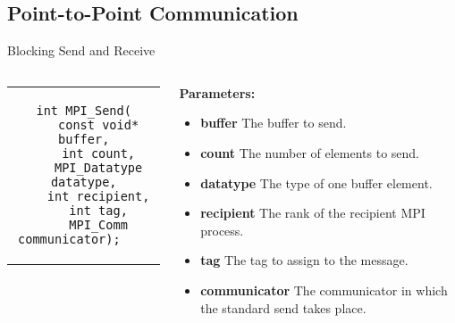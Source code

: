 \subsection{Point-to-Point Communication}

\begin{frame}[fragile]{Blocking Send and Receive}
\begin{columns}
    
\begin{column}{.42\textwidth}
\begin{tabular}{c}
      \begin{verbatim}
int MPI_Send(
    const void* buffer,
    int count,
    MPI_Datatype datatype,
    int recipient,
    int tag,
    MPI_Comm communicator);    
      \end{verbatim}
\end{tabular}
\end{column}

\begin{column}{.58\textwidth}
\textbf{\large Parameters:}

\begin{itemize}
    \item \textbf{buffer} The buffer to send.

    \item \textbf{count} The number of elements to send.

    \item \textbf{datatype} The type of one buffer element.

    \item \textbf{recipient} The rank of the recipient MPI process.

    \item \textbf{tag} The tag to assign to the message.

    \item \textbf{communicator} The communicator in which the standard send takes place.
\end{itemize}

\end{column}
\end{columns}
\end{frame}

